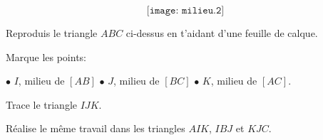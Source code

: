 \[\texttt{[image: milieu.2]}\]
\begin{myenumerate}
\item Reproduis le triangle $ABC$ ci-dessus en t'aidant d'une feuille de calque.
\item Marque les points:
\par
\begin{center}
$\bullet$ $I$, milieu de $[AB]$ \kern1cm $\bullet$ $J$, milieu de $[BC]$\kern1cm  $\bullet$ $K$, milieu de $[AC]$.
\end{center}
\item Trace le triangle $IJK$.
\item Réalise le même travail dans les triangles $AIK$, $IBJ$ et $KJC$.
\end{myenumerate}
